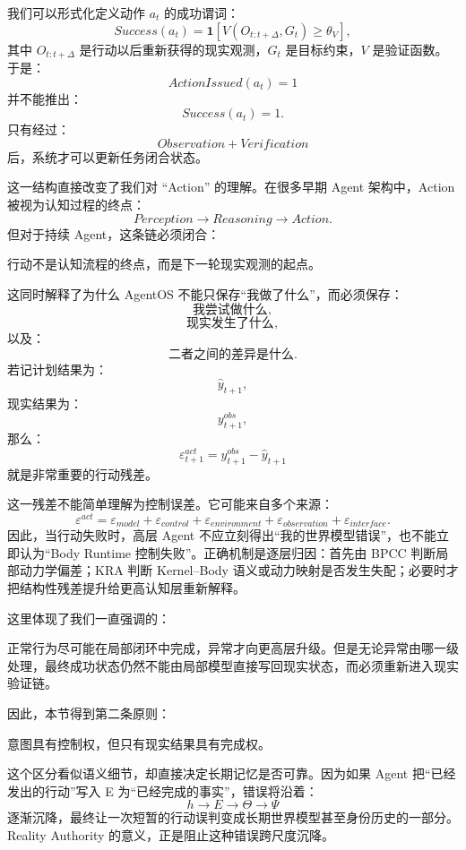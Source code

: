 我们可以形式化定义动作 $a_t$ 的成功谓词：
\[
Success(a_t)
=
\mathbf 1
\left[
V
\left(
O_{t:t+\Delta},
G_t
\right)
\geq\theta_V
\right],
\]
其中 $O_{t:t+\Delta}$ 是行动以后重新获得的现实观测，$G_t$ 是目标约束，$V$ 是验证函数。于是：
\[
ActionIssued(a_t)=1
\]
并不能推出：
\[
Success(a_t)=1.
\]
只有经过：
\[
Observation+Verification
\]
后，系统才可以更新任务闭合状态。

这一结构直接改变了我们对 ``Action'' 的理解。在很多早期 Agent 架构中，Action 被视为认知过程的终点：
\[
Perception\rightarrow Reasoning\rightarrow Action.
\]
但对于持续 Agent，这条链必须闭合：
\begin{statementbox}
\centering
{}
\end{statementbox}
行动不是认知流程的终点，而是下一轮现实观测的起点。

这同时解释了为什么 AgentOS 不能只保存``我做了什么''，而必须保存：
\[
\text{我尝试做什么},
\]
\[
\text{现实发生了什么},
\]
以及：
\[
\text{二者之间的差异是什么}.
\]
若记计划结果为：
\[
\hat{y}_{t+1},
\]
现实结果为：
\[
y^{obs}_{t+1},
\]
那么：
\[
\varepsilon^{act}_{t+1}
=
y^{obs}_{t+1}
-
\hat{y}_{t+1}
\]
就是非常重要的行动残差。

这一残差不能简单理解为控制误差。它可能来自多个来源：
\[
\varepsilon^{act}
=
\varepsilon_{model}
+
\varepsilon_{control}
+
\varepsilon_{environment}
+
\varepsilon_{observation}
+
\varepsilon_{interface}.
\]
因此，当行动失败时，高层 Agent 不应立刻得出``我的世界模型错误''，也不能立即认为``Body Runtime 控制失败''。正确机制是逐层归因：首先由 BPCC 判断局部动力学偏差；KRA 判断 Kernel--Body 语义或动力映射是否发生失配；必要时才把结构性残差提升给更高认知层重新解释。

这里体现了我们一直强调的：
\begin{statementbox}
\centering
{}
\end{statementbox}
正常行为尽可能在局部闭环中完成，异常才向更高层升级。但是无论异常由哪一级处理，最终成功状态仍然不能由局部模型直接写回现实状态，而必须重新进入现实验证链。

因此，本节得到第二条原则：

\begin{proposition*}
意图具有控制权，但只有现实结果具有完成权。
\end{proposition*}

这个区分看似语义细节，却直接决定长期记忆是否可靠。因为如果 Agent 把``已经发出的行动''写入 E 为``已经完成的事实''，错误将沿着：
\[
h\rightarrow E\rightarrow\Theta\rightarrow\Psi
\]
逐渐沉降，最终让一次短暂的行动误判变成长期世界模型甚至身份历史的一部分。Reality Authority 的意义，正是阻止这种错误跨尺度沉降。

